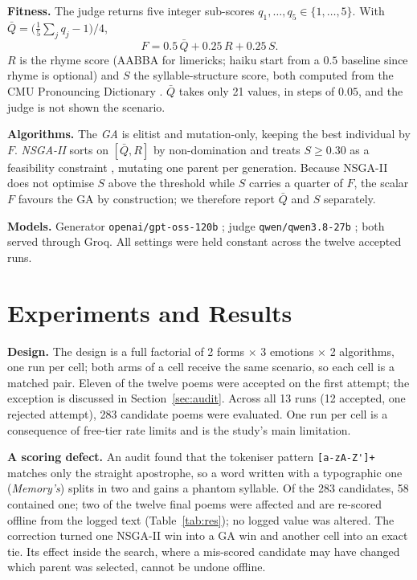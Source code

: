 \documentclass[sigconf,nonacm]{acmart}
\newcommand{\Qb}{\bar{Q}}
\begin{document}
\textbf{Fitness.} The judge returns five integer sub-scores $q_1,\dots,q_5\in\{1,\dots,5\}$. With $\Qb=\big(\tfrac15\sum_j q_j-1\big)/4$,
\begin{equation}
F = 0.5\,\Qb + 0.25\,R + 0.25\,S .
\label{eq:f}
\end{equation}
$R$ is the rhyme score (AABBA for limericks; haiku start from a $0.5$ baseline since rhyme is optional) and $S$ the syllable-structure score, both computed from the CMU Pronouncing Dictionary \cite{cmudict}. $\Qb$ takes only 21 values, in steps of $0.05$, and the judge is not shown the scenario.

\textbf{Algorithms.} The \emph{GA} is elitist and mutation-only, keeping the best individual by $F$. \emph{NSGA-II} \cite{deb2002} sorts on $[\Qb,R]$ by non-domination and treats $S\ge0.30$ as a feasibility constraint \cite{deb2000constraint}, mutating one parent per generation. Because NSGA-II does not optimise $S$ above the threshold while $S$ carries a quarter of $F$, the scalar $F$ favours the GA by construction; we therefore report $\Qb$ and $S$ separately.

\textbf{Models.} Generator \texttt{openai/\allowbreak gpt-oss-120b} \cite{openai2025gptoss}; judge \texttt{qwen/\allowbreak qwen3.8-27b} \cite{qwen2026}; both served through Groq. All settings were held constant across the twelve accepted runs.

\section{Experiments and Results}
\textbf{Design.} The design is a full factorial of 2 forms $\times$ 3 emotions $\times$ 2 algorithms, one run per cell; both arms of a cell receive the same scenario, so each cell is a matched pair. Eleven of the twelve poems were accepted on the first attempt; the exception is discussed in Section~\ref{sec:audit}. Across all 13 runs (12 accepted, one rejected attempt), 283 candidate poems were evaluated. One run per cell is a consequence of free-tier rate limits and is the study's main limitation.

\textbf{A scoring defect.} An audit found that the tokeniser pattern \verb|[a-zA-Z']+| matches only the straight apostrophe, so a word written with a typographic one (\textit{Memory's}) splits in two and gains a phantom syllable. Of the 283 candidates, 58 contained one; two of the twelve final poems were affected and are re-scored offline from the logged text (Table~\ref{tab:res}); no logged value was altered. The correction turned one NSGA-II win into a GA win and another cell into an exact tie. Its effect inside the search, where a mis-scored candidate may have changed which parent was selected, cannot be undone offline.
\end{document}
